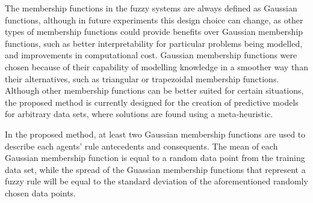 \documentclass{ieeeaccess}
\begin{document}
The membership functions in the fuzzy systems are always defined as Gaussian
functions, although in future experiments this design choice can
change, as other types of membership functions could provide benefits
over Gaussian membership functions, such as better interpretability
for particular problems being modelled, and improvements in
computational cost. Gaussian membership functions were chosen because
of their capability of
modelling knowledge in a smoother way than their alternatives, such as
triangular or trapezoidal membership functions. Although other membership
functions can be better suited for certain situations, the proposed method is
currently designed for the creation of predictive models for arbitrary data sets,
where solutions are found using a meta-heuristic.


In the proposed method, at least two Gaussian membership functions are used to
describe each agents' rule antecedents and consequents. The mean of each Gaussian
membership function is equal to a random data point from the training data set,
while the spread of the Guassian membership functions that represent a fuzzy
rule will be equal to the standard deviation of the aforementioned randomly
chosen data points.
\end{document}
